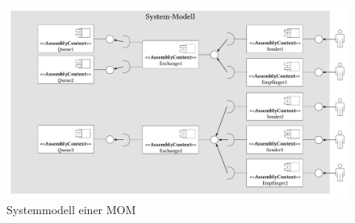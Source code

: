 \begin{figure}
\center
  \includegraphics[width=1\textwidth]{images/modelling/modelingSystem.pdf}
  \caption{Systemmodell einer MOM}
  \label{img:mom_system}
\end{figure}
